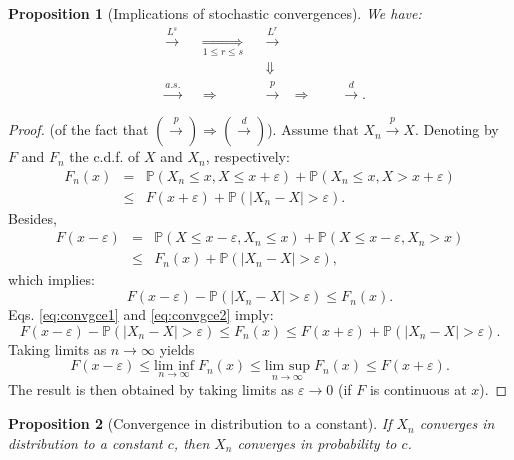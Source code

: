 \documentclass[
  12pt,
]{book}
\newtheorem{proposition}{Proposition}[chapter]
\theoremstyle{definition}
\theoremstyle{definition}
\theoremstyle{definition}
\theoremstyle{definition}
\theoremstyle{remark}
\begin{document}
\begin{proposition}[Implications of stochastic convergences]
\protect\hypertarget{prp:implicationsconv}{}\label{prp:implicationsconv}We have:
\begin{align*}
&\boxed{\overset{L^s}{\rightarrow}}& &\underset{1 \le r \le s}{\Rightarrow}& &\boxed{\overset{L^r}{\rightarrow}}&\\
&& && &\Downarrow&\\
&\boxed{\overset{a.s.}{\rightarrow}}& &\Rightarrow& &\boxed{\overset{p}{\rightarrow}}& \Rightarrow \qquad \boxed{\overset{d}{\rightarrow}}.
\end{align*}
\end{proposition}

\begin{proof}
(of the fact that \(\left(\overset{p}{\rightarrow}\right) \Rightarrow \left( \overset{d}{\rightarrow}\right)\)). Assume that \(X_n \overset{p}{\rightarrow} X\). Denoting by \(F\) and \(F_n\) the c.d.f. of \(X\) and \(X_n\), respectively:
\begin{eqnarray*}
F_n(x) &=& \mathbb{P}(X_n \le x,X\le x+\varepsilon) + \mathbb{P}(X_n \le x,X > x+\varepsilon)\\
&\le& F(x+\varepsilon) + \mathbb{P}(|X_n - X|>\varepsilon).\label{eq:convgce1}
\end{eqnarray*}
Besides,
\begin{eqnarray*}
F(x-\varepsilon) &=& \mathbb{P}(X \le x-\varepsilon,X_n \le x) + \mathbb{P}(X \le x-\varepsilon,X_n > x)\\
&\le& F_n(x) + \mathbb{P}(|X_n - X|>\varepsilon),
\end{eqnarray*}
which implies:
\begin{equation}
F(x-\varepsilon) - \mathbb{P}(|X_n - X|>\varepsilon) \le F_n(x).\label{eq:convgce2}
\end{equation}
Eqs. \eqref{eq:convgce1} and \eqref{eq:convgce2} imply:
\[
F(x-\varepsilon) - \mathbb{P}(|X_n - X|>\varepsilon) \le F_n(x)  \le F(x+\varepsilon) + \mathbb{P}(|X_n - X|>\varepsilon).
\]
Taking limits as \(n \rightarrow \infty\) yields
\[
F(x-\varepsilon) \le \underset{n \rightarrow \infty}{\mbox{lim inf}}\; F_n(x) \le \underset{n \rightarrow \infty}{\mbox{lim sup}}\; F_n(x)  \le F(x+\varepsilon).
\]
The result is then obtained by taking limits as \(\varepsilon \rightarrow 0\) (if \(F\) is continuous at \(x\)).
\end{proof}

\begin{proposition}[Convergence in distribution to a constant]
\protect\hypertarget{prp:cvgce11}{}\label{prp:cvgce11}If \(X_n\) converges in distribution to a constant \(c\), then \(X_n\) converges in probability to \(c\).
\end{proposition}
\end{document}
